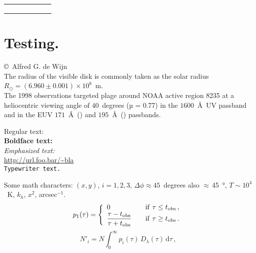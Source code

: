 \begin{table}
\begin{tabular}{@{}SSSSSS@{}}
 	&  	&  		&  	&  	& \\ 
 	&  	&  		&  	&  	& \\ 
 	&  	&  		&  	&  	& \\


		\bottomrule
    \end{tabular}
\end{table}

\section[Testing]{Testing. \hyperlink{toc}{\hyperback}}

\copyright~Alfred G. de Wijn\\
The radius of the visible disk is commonly taken as the solar radius $R_\odot=(6.960\pm0.001)\times10^8$~m.\\
The 1998 observations targeted plage around NOAA active region 8235 at a heliocentric viewing angle of $40$~degrees (µ = 0.77) in the $1600$~\AA\ UV passband and in the EUV $171$~\AA\ () and $195$~\AA\ () passbands.

Regular text: \ \\
\textbf{Boldface text: \ }\\
\emph{Emphasized text: \ }\\
\url{http://url.foo.bar/~bla}\\
\texttt{Typewriter text.}

Some math characters: $(x,y)$, $i=1,2,3$, $\Delta\phi\approx45$~degrees also $\approx$\,\SI{45}{\degree}, $T\sim10^4$~K, $k_h$, $x^2$, arcsec$^{-1}$.
\begin{equation}
	p_1(\tau)=\left\{\begin{array}{ll}
		\displaystyle0&\kern1em \mathrm{if}~\tau\le t_\mathrm{obs}\,,\\
		\displaystyle\frac{\tau-t_\mathrm{obs}}{\tau+t_\mathrm{obs}}&
			\kern1em \mathrm{if}~\tau\ge t_\mathrm{obs}\,.
		\end{array}\right.
\end{equation}
\begin{equation}
	N'_i=
		N\int_0^\infty\!\!p_i(\tau)\,
		D_\lambda(\tau)\,\mathrm{d}\tau\,,
\end{equation}

